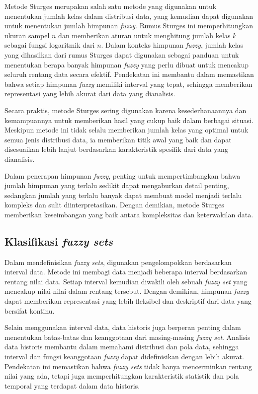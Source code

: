 \documentclass[conference]{IEEEtran}
\begin{document}
Metode Sturges merupakan salah satu metode yang digunakan untuk menentukan jumlah kelas dalam distribusi data, yang kemudian dapat digunakan untuk menentukan jumlah himpunan \textit{fuzzy}. Rumus Sturges ini memperhitungkan ukuran sampel \( n \) dan memberikan aturan untuk menghitung jumlah kelas \( k \) sebagai fungsi logaritmik dari \( n \). Dalam konteks himpunan \textit{fuzzy}, jumlah kelas yang dihasilkan dari rumus Sturges dapat digunakan sebagai panduan untuk menentukan berapa banyak himpunan \textit{fuzzy} yang perlu dibuat untuk mencakup seluruh rentang data secara efektif. Pendekatan ini membantu dalam memastikan bahwa setiap himpunan \textit{fuzzy} memiliki interval yang tepat, sehingga memberikan representasi yang lebih akurat dari data yang dianalisis.

Secara praktis, metode Sturges sering digunakan karena kesederhanaannya dan kemampuannya untuk memberikan hasil yang cukup baik dalam berbagai situasi. Meskipun metode ini tidak selalu memberikan jumlah kelas yang optimal untuk semua jenis distribusi data, ia memberikan titik awal yang baik dan dapat disesuaikan lebih lanjut berdasarkan karakteristik spesifik dari data yang dianalisis. 

Dalam penerapan himpunan \textit{fuzzy}, penting untuk mempertimbangkan bahwa jumlah himpunan yang terlalu sedikit dapat mengaburkan detail penting, sedangkan jumlah yang terlalu banyak dapat membuat model menjadi terlalu kompleks dan sulit diinterpretasikan. Dengan demikian, metode Sturges memberikan keseimbangan yang baik antara kompleksitas dan keterwakilan data.



\subsection{Klasifikasi \textit{fuzzy sets}}
Dalam mendefinisikan \textit{fuzzy sets}, digunakan pengelompokkan berdasarkan interval data. Metode ini membagi data menjadi beberapa interval berdasarkan rentang nilai data. Setiap interval kemudian diwakili oleh sebuah \textit{fuzzy set} yang mencakup nilai-nilai dalam rentang tersebut. Dengan demikian, himpunan \textit{fuzzy} dapat memberikan representasi yang lebih fleksibel dan deskriptif dari data yang bersifat kontinu.

Selain menggunakan interval data, data historis juga berperan penting dalam menentukan batas-batas dan keanggotaan dari masing-masing \textit{fuzzy set}. Analisis data historis membantu dalam memahami distribusi dan pola data, sehingga interval dan fungsi keanggotaan \textit{fuzzy} dapat didefinisikan dengan lebih akurat. Pendekatan ini memastikan bahwa \textit{fuzzy sets} tidak hanya mencerminkan rentang nilai yang ada, tetapi juga memperhitungkan karakteristik statistik dan pola temporal yang terdapat dalam data historis.
\end{document}
